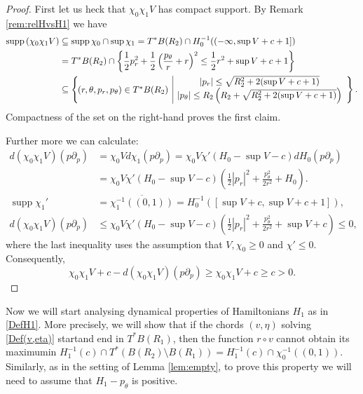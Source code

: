 \documentclass[a4paper]{amsart}
\numberwithin{equation}{section}
\newcommand{\supp}{\operatorname{supp}}
\begin{document}
\begin{proof}
First let us heck that $\chi_0\chi_1 V$ has compact support. By Remark \ref{rem:relHvsH1} we have
\begin{align*}
\supp \left( \chi_0\chi_1 V\right) & \subseteq \supp \chi_0 \cap \sup \chi_1= T^*B(R_2)\cap H_0^{-1}((-\infty, \sup V +c +1])\\
& = T^*B(R_2)\cap\left\lbrace \frac{1}{2}p_r^2+\frac{1}{2}\left(\frac{p_\theta}{r}+r\right)^2\leq \frac{1}{2}r^2+\sup V +c +1 \right\rbrace\\
& \subseteq \left\lbrace 
\begin{array}{c | c}
 & |p_r|\leq \sqrt{R_2^2+2(\sup V +c +1)}\\
\hspace*{-0.2cm}\smash{\raisebox{.5\normalbaselineskip}{$(r,\theta, p_r, p_\theta) \in T^*B(R_2)$}} & 
|p_\theta|\leq R_2 \left( R_2+ \sqrt{R_2^2+2(\sup V +c +1)}\right)
\end{array}\right\rbrace.
\end{align*}
Compactness of the set on the right-hand proves the first claim.

Further more we can calculate: 
\begin{align*}
d(\chi_0\chi_1 V)(p\partial_p) & = \chi_0 V d\chi_1(p\partial_p) = \chi_0 V \chi'(H_0-\sup V -c)dH_0(p\partial_p)\\
& = \chi_0 V \chi'(H_0-\sup V -c)\left(\frac{1}{2}|p_r|^2+\frac{p_\theta^2}{2r^2}+
H_0\right).\\
\supp \chi_1' & =\overline{\chi_1^{-1}((0,1))}=H_0^{-1}([\sup V +c, \sup V+c+1]),\\
d(\chi_0\chi_1 V)(p\partial_p) & \leq \chi_0 V \chi'(H_0-\sup V -c)\left(\frac{1}{2}|p_r|^2+\frac{p_\theta^2}{2r^2}+\sup V + c\right)\leq 0,
\end{align*}
where the last inequality uses the assumption that $V, \chi_0 \geq 0$ and $\chi'\leq 0$. Consequently, 
$$
\chi_0\chi_1 V+c-d(\chi_0\chi_1 V)(p\partial_p) \geq \chi_0\chi_1 V+c\geq c>0.
$$
\end{proof}

Now we will start analysing dynamical properties of Hamiltonians $H_1$ as in \eqref{DefH1}. More precisely, we will show that if the chords $(v,\eta)$ solving \eqref{Def(v,eta)} start\linebreak and end in $T^*B(R_1)$, then the function $r\circ v$ cannot obtain its maximum\linebreak in $H_1^{-1}(c)\cap T^*(B(R_2)\setminus B(R_1))= H_1^{-1}(c) \cap \chi_0^{-1}((0,1))$. Similarly, as in the setting of Lemma \ref{lem:empty}, to prove this property we will need to assume that $H_1-p_\theta$ is positive.
\end{document}
